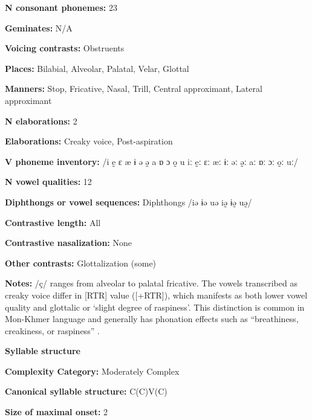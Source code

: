 \textbf{N consonant phonemes:} 23



\textbf{Geminates:} N/A



\textbf{Voicing contrasts:} Obstruents



\textbf{Places:} Bilabial, Alveolar, Palatal, Velar, Glottal



\textbf{Manners:} Stop, Fricative, Nasal, Trill, Central approximant, Lateral approximant



\textbf{N elaborations:} 2



\textbf{Elaborations:} Creaky voice, Post-aspiration



\textbf{V phoneme inventory:} /i ḛ ɛ æ ɨ ə ə̰ a ɒ ɔ o̰ u iː ḛː ɛː æː ɨː əː ə̰ː aː ɒː ɔː o̰ː uː/



\textbf{N vowel qualities:} 12



\textbf{Diphthongs or vowel sequences:} Diphthongs /iə ɨə uə iə̰ ɨə̰ uə̰/



\textbf{Contrastive length:} All



\textbf{Contrastive nasalization:} None



\textbf{Other contrasts:} Glottalization (some)



\textbf{Notes:} /ç/ ranges from alveolar to palatal fricative. The vowels transcribed as creaky voice differ in [RTR] value ([+RTR]), which manifests as both lower vowel quality and glottalic or ‘slight degree of raspiness’. This distinction is common in Mon-Khmer language and generally has phonation effects such as “breathiness, creakiness, or raspiness” \citep[14]{Alves2006}.



\textbf{Syllable structure}



\textbf{Complexity Category:} Moderately Complex



\textbf{Canonical syllable structure:} C(C)V(C) \citep[17-21]{Alves2006}



\textbf{Size of maximal onset:} 2



